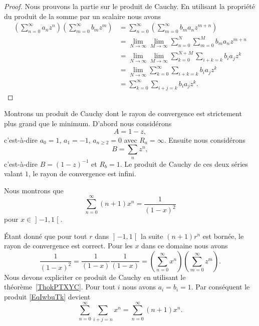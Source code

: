 \begin{proof}
    Nous prouvons la partie sur le produit de Cauchy. En utilisant la propriété du produit de la somme par un scalaire nous avons
    \begin{subequations}
        \begin{align}
            \left( \sum_{n=0}^{\infty}a_nz^n \right)\left( \sum_{m=0}^{\infty}b_mz^m \right)&=\sum_{n=0}^{\infty}\left( \sum_{m=0}^{\infty}b_ma_nz^{m+n} \right)\\
            &=\lim_{N\to \infty} \lim_{M\to \infty} \sum_{n=0}^N\sum_{m=0}^Mb_ma_nz^{m+n}\\
            &=\lim_{N\to \infty} \lim_{M\to \infty} \sum_{k=0}^{N+M}\sum_{i+k=k}b_ia_jz^k\\
            &=\lim_{N\to \infty} \sum_{k=0}^{\infty}\sum_{i+k=k}b_ia_jz^k\\
            &=\sum_{k=0}^{\infty}\sum_{i+j=k}b_ia_jz^k.
        \end{align}
    \end{subequations}
\end{proof}

\begin{example}
    Montrons un produit de Cauchy dont le rayon de convergence est strictement plus grand que le minimum. D'abord nous considérons
    \begin{equation}
        A=1-z,
    \end{equation}
    c'est-à-dire \( a_0=1\), \( a_1=-1\), \( a_{n\geq 2}=0\) avec \( R_a=\infty\). Ensuite nous considérons
    \begin{equation}
        B=\sum_nz^n,
    \end{equation}
    c'est-à-dire \( B=(1-z)^{-1}\) et \( R_b=1\). Le produit de Cauchy de ces deux séries valant \( 1\), le rayon de convergence est infini.
\end{example}

\begin{example}
    Nous montrons que
    \begin{equation}
        \sum_{n=0}^{\infty}(n+1)x^n=\frac{1}{ (1-x)^2 }
    \end{equation}
    pour \( x\in\mathopen] -1 , 1 \mathclose[\).

    Étant donné que pour tout \( r\) dans \( \mathopen] -1 , 1 \mathclose[\) la suite \( (n+1)r^n\) est bornée, le rayon de convergence est correct. Pour les \( x\) dans ce domaine nous avons
    \begin{equation}        \label{EqIwbuTk}
        \frac{1}{ (1-x)^2 }=\frac{1}{ (1-x) }\frac{1}{ (1-x) }=\left( \sum_{n=0}^{\infty}x^n \right)\left( \sum_{m=0}^{\infty}z^m \right).
    \end{equation}
    Nous devons expliciter ce produit de Cauchy en utilisant le théorème~\ref{ThokPTXYC}. Pour tout \( i\) nous avons \( a_i=b_i=1\). Par conséquent le produit \eqref{EqIwbuTk} devient
    \begin{equation}
        \sum_{n=0}^{\infty}\sum_{i+j=n}x^n=\sum_{n=0}^{\infty}(n+1)x^n.
    \end{equation}
\end{example}

